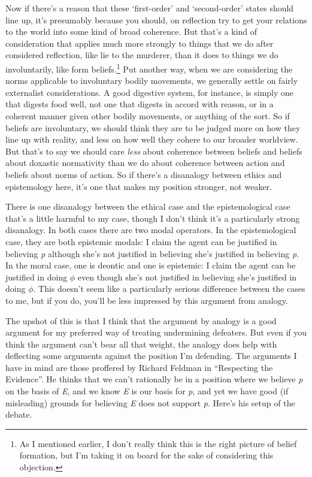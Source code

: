 \documentclass[
  10pt,
  letterpaper,
  DIV=11,
  numbers=noendperiod,
  twoside]{scrartcl}
\begin{document}
Now if there's a reason that these `first-order' and `second-order'
states should line up, it's presumably because you should, on reflection
try to get your relations to the world into some kind of broad
coherence. But that's a kind of consideration that applies much more
strongly to things that we do after considered reflection, like lie to
the murderer, than it does to things we do involuntarily, like form
beliefs.\footnote{As I mentioned earlier, I don't really think this is
  the right picture of belief formation, but I'm taking it on board for
  the sake of considering this objection.} Put another way, when we are
considering the norms applicable to involuntary bodily movements, we
generally settle on fairly externalist considerations. A good digestive
system, for instance, is simply one that digests food well, not one that
digests in accord with reason, or in a coherent manner given other
bodily movements, or anything of the sort. So if beliefs are
involuntary, we should think they are to be judged more on how they line
up with reality, and less on how well they cohere to our broader
worldview. But that's to say we should care \emph{less} about coherence
between beliefs and beliefs about doxastic normativity than we do about
coherence between action and beliefs about norms of action. So if
there's a disanalogy between ethics and epistemology here, it's one that
makes my position stronger, not weaker.

There is one disanalogy between the ethical case and the epistemological
case that's a little harmful to my case, though I don't think it's a
particularly strong disanalogy. In both cases there are two modal
operators. In the epistemological case, they are both epistemic modals:
I claim the agent can be justified in believing \emph{p} although she's
not justified in believing she's justified in believing \emph{p}. In the
moral case, one is deontic and one is epistemic: I claim the agent can
be justified in doing \(\phi\) even though she's not justified in
believing she's justified in doing \(\phi\). This doesn't seem like a
particularly serious difference between the cases to me, but if you do,
you'll be less impressed by this argument from analogy.

The upshot of this is that I think that the argument by analogy is a
good argument for my preferred way of treating undermining defeaters.
But even if you think the argument can't bear all that weight, the
analogy does help with deflecting some arguments against the position
I'm defending. The arguments I have in mind are those proffered by
Richard Feldman in ``Respecting the Evidence''. He thinks that we can't
rationally be in a position where we believe \emph{p} on the basis of
\emph{E}, and we know \emph{E} is our basis for \emph{p}, and yet we
have good (if misleading) grounds for believing \emph{E} does not
support \emph{p}. Here's his setup of the debate.
\end{document}
